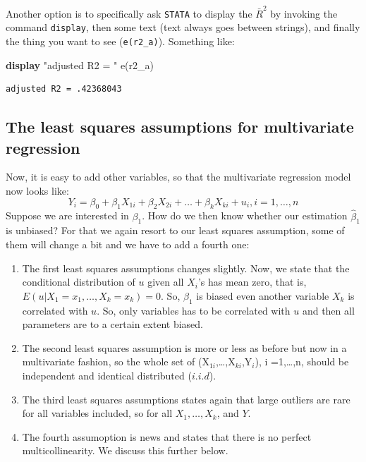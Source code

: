 \documentclass[
]{book}
\newenvironment{Shaded}{\begin{snugshade}}{\end{snugshade}}
\newcommand{\FunctionTok}[1]{\textcolor[rgb]{0.00,0.00,0.00}{#1}}
\newcommand{\KeywordTok}[1]{\textcolor[rgb]{0.13,0.29,0.53}{\textbf{#1}}}
\newcommand{\NormalTok}[1]{#1}
\newcommand{\StringTok}[1]{\textcolor[rgb]{0.31,0.60,0.02}{#1}}
\providecommand{\tightlist}{%
  \setlength{\itemsep}{0pt}\setlength{\parskip}{0pt}}
\begin{document}
Another option is to specifically ask \texttt{STATA} to display the \(\bar{R}^2\) by invoking the command \texttt{display}, then some text (text always goes between strings), and finally the thing you want to see (\texttt{e(r2\_a)}). Something like:

\begin{Shaded}
\begin{Highlighting}[]
\KeywordTok{display} \StringTok{"adjusted R2 = "} \FunctionTok{e}\NormalTok{(r2\_a)}
\end{Highlighting}
\end{Shaded}

\begin{verbatim}
adjusted R2 = .42368043
\end{verbatim}

\hypertarget{the-least-squares-assumptions-for-multivariate-regression}{%
\subsection{The least squares assumptions for multivariate regression}\label{the-least-squares-assumptions-for-multivariate-regression}}

Now, it is easy to add other variables, so that the multivariate regression model now looks like:
\begin{equation}
Y_i = \beta_0 + \beta_1 X_{1i} + \beta_2 X_{2i}+\ldots + \beta_k X_{ki}+u_i, i=1,\ldots,n
\end{equation}
Suppose we are interested in \(\beta_1\). How do we then know whether our estimation \(\hat{\beta}_1\) is unbiased? For that we again resort to our least squares assumption, some of them will change a bit and we have to add a fourth one:

\begin{enumerate}
\def\labelenumi{\arabic{enumi}.}
\tightlist
\item
  The first least squares assumptions changes slightly. Now, we state that the conditional distribution of \(u\) given all \(X_i\)'s has mean zero, that is, \(E(u|X_1 = x_1,\ldots, X_k = x_k) = 0\). So, \(\beta_1\) is biased even another variable \(X_k\) is correlated with \(u\). So, only variables has to be correlated with \(u\) and then all parameters are to a certain extent biased.
\item
  The second least squares assumption is more or less as before but now in a multivariate fashion, so the whole set of (X\(_{1i}\),\ldots,X\(_{ki}\),Y\(_i\)), i =1,\ldots,n, should be independent and identical distributed (\(i.i.d\)).
\item
  The third least squares assumptions states again that large outliers are rare for all variables included, so for all \(X_1,\ldots, X_k\), and \(Y\).
\item
  The fourth assumoption is news and states that there is no perfect multicollinearity. We discuss this further below.
\end{enumerate}
\end{document}
